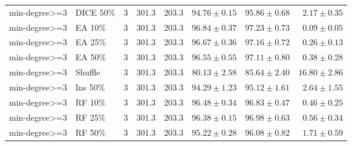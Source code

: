 {\begin{longtable}{llrrrrrr}
min-degree>=3 & DICE 50\% & 3 & 301.3 & 203.3 & $94.76\pm0.15$ & $95.86\pm0.68$ & $2.17\pm0.35$ \\
min-degree>=3 & EA 10\% & 3 & 301.3 & 203.3 & $96.84\pm0.37$ & $97.23\pm0.73$ & $0.09\pm0.05$ \\
min-degree>=3 & EA 25\% & 3 & 301.3 & 203.3 & $96.67\pm0.36$ & $97.16\pm0.72$ & $0.26\pm0.13$ \\
min-degree>=3 & EA 50\% & 3 & 301.3 & 203.3 & $96.55\pm0.55$ & $97.11\pm0.80$ & $0.38\pm0.28$ \\
min-degree>=3 & Shuffle & 3 & 301.3 & 203.3 & $80.13\pm2.58$ & $85.64\pm2.40$ & $16.80\pm2.86$ \\
min-degree>=3 & Ins 50\% & 3 & 301.3 & 203.3 & $94.29\pm1.23$ & $95.12\pm1.61$ & $2.64\pm1.55$ \\
min-degree>=3 & RF 10\% & 3 & 301.3 & 203.3 & $96.48\pm0.34$ & $96.83\pm0.47$ & $0.46\pm0.25$ \\
min-degree>=3 & RF 25\% & 3 & 301.3 & 203.3 & $96.38\pm0.15$ & $96.98\pm0.63$ & $0.56\pm0.34$ \\
min-degree>=3 & RF 50\% & 3 & 301.3 & 203.3 & $95.22\pm0.28$ & $96.08\pm0.82$ & $1.71\pm0.59$ \\
\end{longtable}
}

